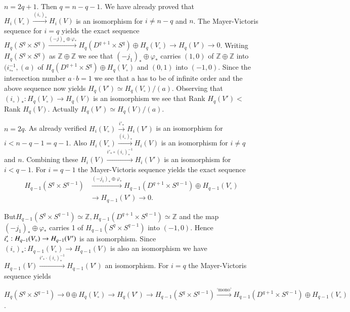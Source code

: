\medskip
{}%
$n = 2q +1$. Then $q = n-q-1$. We have already proved that $H_i (V_\circ )
  \xrightarrow{(i_\circ)_*} H_i (V)$ is an isomorphism for $i \neq n-q$
  and $n$. The Mayer-Victoris sequence for $ i = q$ yields the exact
  sequence $H_q (S^q \times S^q) \xrightarrow{(-j)_* \oplus \varphi_*}
  H_q (D^{q +1} \times S^q) \oplus H_q (V_\circ) \to H_q (V') \to
  0$. Writing $H_q (S^q \times S^q)$ as $\mathbb{Z} \oplus \mathbb{Z}$
  we see that $(-j_1)_* \oplus \varphi_*$ carries $(1,0)$ of
  $\mathbb{Z} \oplus \mathbb{Z}$ into $(i^{-1}_{\circ_*}, (a)$ of $H_q
  (D^{q+1} \times 
  S^q) \oplus H_q (V_\circ)$ and $(0, 1)$ into $(-1, 0)$. Since the
  intersection number $a \cdot b =1$ we see that a has to be of infinite
  order and the above sequence now yields $H_q (V') \simeq H_q (V_\circ) /
  (a)$. Observing that $(i_\circ)_*: H_q (V_\circ) \to H_q (V)$ is an
  isomorphism we see that Rank $H_q (V') <$ Rank $H_q (V)$. Actually
  $H_q (V') \simeq H_q (V)/ (a)$. 

\medskip
{}%
$n = 2q$. As already verified $H_i (V_\circ) \xrightarrow{i'_*} H_i (V')$
  is an isomorphism for $i <n-q-1=q-1$. Also $H_i (V_\circ)
  \xrightarrow{(i_\circ)_*} H_i (V)$ is an isomorphism for $i \neq q$ and
  $n$. Combining these $H_i (V) \xrightarrow{i'_* \circ (i_\circ)^{-1}_*}H_i
  (V')$ is an isomorphism for $i < q -1$. For $i = q-1$ the
  Mayer-Victoris sequence yields the exact sequence  
\begin{align*}
H_{q-1} (S^q \times S^{q-1}) &\xrightarrow{(-j_1)_* \oplus \varphi_*}
  H_{q-1}(D^{q+1} \times S^{q-1}) \oplus H_{q-1} (V_\circ)\\ 
&\to H_{q-1} (V') \to 0. 
\end{align*}

But\pageoriginale $H_{q-1} (S^q \times S^{q-1}) \simeq \mathbb{Z}, 
H_{q-1} (D^{q+1} 
\times S^{q-1}) \simeq \mathbb{Z}$ and the map $(-j_1)_* \oplus
\varphi_*$ carries 1 of $H_{q-1} (S^q \times S^{q-1})$ into $(-1,
0)$. Hence $i'_*: H_{q-1}\break (V_\circ) \to H_{q-1}(V')$ is an
isomorphism. Since $(i_\circ)_*: H_{q-1} (V_\circ)\to H_{q-1} (V)$ is also
an isomorphism we have $H_{q-1}(V) \xrightarrow{i'_* \cdot (i_\circ)^{-1}_*}
H_{q-1} (V')$ an isomorphism. For $i = q$ the Mayer-Victoris sequence
yields  

$H_q (S^q \times S^{q-1}) \to 0 \oplus H_q (V_\circ) \to H_q (V') \to
H_{q-1} (S^q \times S^{q-1}) \xrightarrow{\text{`mono'}} H_{q-1}
(D^{q+1} \times S^{q-1} ) \oplus H_{q-1}(V_\circ)$.  

